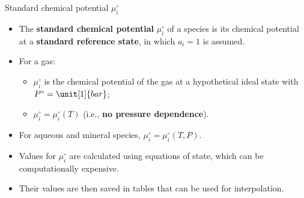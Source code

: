 %
%
\begin{frame}{Standard chemical potential $\mu_{i}^{\circ}$}
\begin{itemize}[<+->]
\item The \textbf{standard chemical potential} $\mu_{i}^{\circ}$ of a
species is its chemical potential at a \alert{\bf{standard reference state}},
in which $a_{i}=1$ is assumed.
\item For a gas: 
\begin{itemize}
\item $\mu_{i}^{\circ}$ is the chemical potential
of the gas at a hypothetical ideal state with $P^{\circ}=\unit[1]{bar}$;
\item $\mu_{i}^{\circ}=\mu_{i}^{\circ}(T)$ (i.e., \textbf{no
pressure dependence}).
\end{itemize}
\item For aqueous and mineral species, ${\mu_{i}^{\circ}=\mu_{i}^{\circ}(T,P)}$.
\item Values for $\mu_{i}^{\circ}$ are calculated using equations of state,
which can be computationally expensive.
\item Their values are then saved in tables that can be used for interpolation.
\end{itemize}
\end{frame}
%
%
